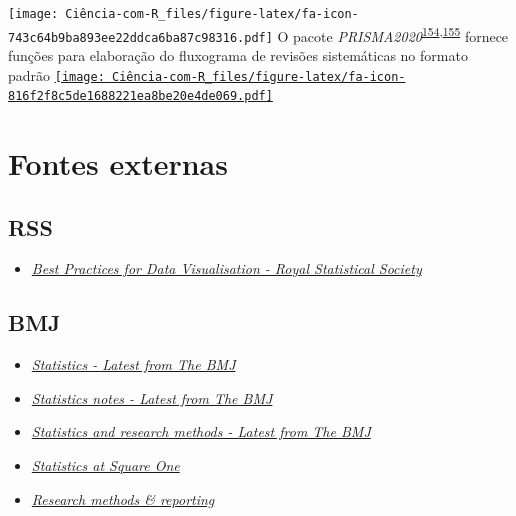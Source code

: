 \documentclass[
]{book}
\providecommand{\tightlist}{%
  \setlength{\itemsep}{0pt}\setlength{\parskip}{0pt}}
\begin{document}
\texttt{[image: Ciência-com-R\_files/figure-latex/fa-icon-743c64b9ba893ee22ddca6ba87c98316.pdf]} O pacote \emph{PRISMA2020}\textsuperscript{\protect\hyperlink{ref-PRISMA2020-2}{154},\protect\hyperlink{ref-PRISMA2020}{155}} fornece funções para elaboração do fluxograma de revisões sistemáticas no formato padrão \href{https://cran.r-project.org/web/packages/PRISMA2020/index.html}{\texttt{[image: Ciência-com-R\_files/figure-latex/fa-icon-816f2f8c5de1688221ea8be20e4de069.pdf]}}

\hypertarget{fontes-externas}{%
\chapter{\texorpdfstring{\textbf{Fontes externas}}{Fontes externas}}\label{fontes-externas}}

\hypertarget{rss}{%
\section{RSS}\label{rss}}

\begin{itemize}
\tightlist
\item
  \href{https://royal-statistical-society.github.io/datavisguide/}{\emph{Best Practices for Data Visualisation - Royal Statistical Society}}
\end{itemize}

\hypertarget{bmj}{%
\section{BMJ}\label{bmj}}

\begin{itemize}
\item
  \href{https://www.bmj.com/specialties/statistics}{\emph{Statistics - Latest from The BMJ}}
\item
  \href{https://www.bmj.com/specialties/statistics-notes}{\emph{Statistics notes - Latest from The BMJ}}
\item
  \href{https://www.bmj.com/specialties/statistics-and-research-methods}{\emph{Statistics and research methods - Latest from The BMJ}}
\item
  \href{https://www.bmj.com/about-bmj/resources-readers/publications/statistics-square-one}{\emph{Statistics at Square One}}
\item
  \href{https://www.bmj.com/research/research-methods-and-reporting}{\emph{Research methods \& reporting}}
\end{itemize}
\end{document}
